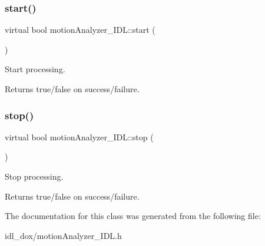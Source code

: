 \subsubsection{\texorpdfstring{start()}{start()}}
{\footnotesize\ttfamily virtual bool motion\+Analyzer\+\_\+\+I\+D\+L\+::start (\begin{DoxyParamCaption}{ }\end{DoxyParamCaption})\hspace{0.3cm}{\ttfamily [virtual]}}



Start processing. 

\begin{DoxyReturn}{Returns}
true/false on success/failure. 
\end{DoxyReturn}
\mbox{\label{classmotionAnalyzer__IDL_affddad47070a4fdb10357c10037f39f5}} 
\subsubsection{\texorpdfstring{stop()}{stop()}}
{\footnotesize\ttfamily virtual bool motion\+Analyzer\+\_\+\+I\+D\+L\+::stop (\begin{DoxyParamCaption}{ }\end{DoxyParamCaption})\hspace{0.3cm}{\ttfamily [virtual]}}



Stop processing. 

\begin{DoxyReturn}{Returns}
true/false on success/failure. 
\end{DoxyReturn}


The documentation for this class was generated from the following file\+:\begin{DoxyCompactItemize}
\item 
idl\+\_\+dox/motion\+Analyzer\+\_\+\+I\+D\+L.\+h\end{DoxyCompactItemize}
